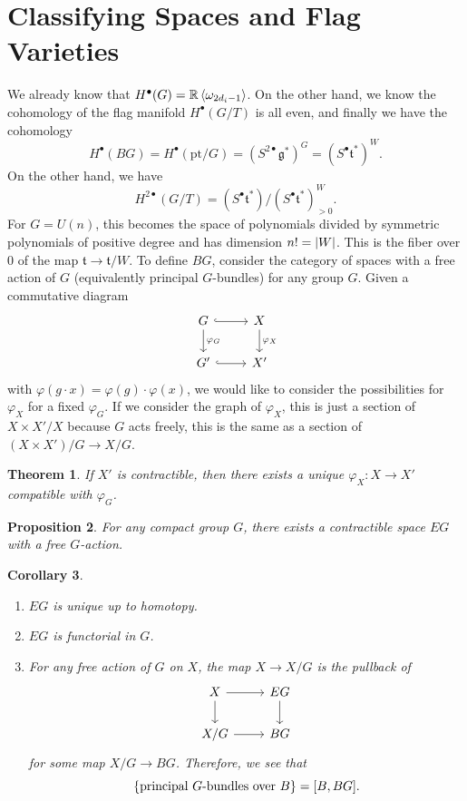 \documentclass[leqno, openany]{memoir}
\newtheorem{thm}{Theorem}[section]
\newtheorem{cor}[thm]{Corollary}
\newtheorem{prop}[thm]{Proposition}
\theoremstyle{definition}
\theoremstyle{remark}
\theoremstyle{plain}
\theoremstyle{definition}
\theoremstyle{remark}
\newcommand{\R}{\mathbb{R}}
\newcommand{\mf}[1]{\mathfrak{#1}}
\newcommand{\mr}[1]{\mathrm{#1}}
\begin{document}
\section{Classifying Spaces and Flag Varieties}%
\label{sec:classifying_spaces_and_flag_varieties}

We already know that $H^{\bullet}(G) = \R \ev{\omega_{2d_i - 1}}$. On the other
hand, we know the cohomology of the flag manifold $H^{\bullet}(G/T)$ is all
even, and finally we have the cohomology \[ H^{\bullet}(BG) =
H^{\bullet}(\mr{pt} /G) = {(S^{2\bullet} \mf{g}^*)}^G = {(S^{\bullet}
\mf{t}^*)}^W. \] On the other hand, we have \[ H^{2\bullet}(G/T) =
{(S^{\bullet} \mf{t}^*)} / {(S^{\bullet} \mf{t}^*)}^W_{>0}. \] For $G = U(n)$,
this becomes the space of polynomials divided by symmetric polynomials of
positive degree and has dimension $n! = \abs{W}$. This is the fiber over $0$ of
the map $\mf{t} \to \mf{t} / W$. To define $BG$, consider the category of
spaces with a free action of $G$ (equivalently principal $G$-bundles) for any
group $G$. Given a commutative diagram \begin{equation*} \begin{tikzcd} G
\ar[hookrightarrow]{r} \ar{d}{\varphi_G} & X \ar{d}{\varphi_X} \\ G'
\ar[hookrightarrow]{r} & X' \end{tikzcd} \end{equation*} with $\varphi(g \cdot
x) = \varphi(g) \cdot \varphi(x)$, we would like to consider the possibilities
for $\varphi_X$ for a fixed $\varphi_G$. If we consider the graph of
$\varphi_X$, this is just a section of $X \times X' / X$ because $G$ acts
freely, this is the same as a section of $(X \times X')/G \to X/G$.

\begin{thm} If $X'$ is contractible, then there exists a unique $\varphi_X
\colon X \to X'$ compatible with $\varphi_G$.  \end{thm}

\begin{prop} For any compact group $G$, there exists a contractible space $EG$
with a free $G$-action.  \end{prop}

\begin{cor}\leavevmode \begin{enumerate} \item $EG$ is unique up to homotopy.
    \item $EG$ is functorial in $G$.  \item For any free action of $G$ on $X$,
        the map $X \to X/G$ is the pullback of \begin{equation*} \begin{tikzcd}
            X \ar{r} \ar{d} & EG \ar{d} \\ X/G \ar{r} & BG \end{tikzcd}
        \end{equation*} for some map $X/G \to BG$. Therefore, we see that \[
\qty{\text{principal $G$-bundles over $B$}} = [B, BG]. \] \end{enumerate}
\end{cor}
\end{document}
